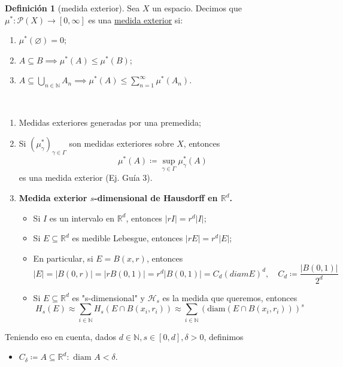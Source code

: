 \documentclass[11pt]{article}
\theoremstyle{definition} %
\newtheorem{definition}[theorem]{Definición}
\newcommand{\R}{\mathbb{R}}
\newcommand{\N}{\mathbb{N}}
\begin{document}
\begin{property}
\begin{definition}[medida exterior]
	Sea $X$ un espacio. Decimos que $\mu^{*} : \mathscr{P}(X)\to[0,\infty]$ es una \underline{medida exterior} si:
	\begin{enumerate}
		\item $\mu^{*}(\varnothing) = 0$;

		\item $A \subseteq B \implies \mu^{*}(A)\leq \mu^{*}(B)$;

		\item $A \subseteq \bigcup_{n\in\N} A_n \implies \mu^{*}(A) \leq \sum_{n=1}^{\infty} \mu^{*}(A_n)$.
	\end{enumerate}
\end{definition}

\begin{eg}~
	\begin{enumerate}
		\item Medidas exteriores generadas por una premedida;

		\item Si $(\mu_{\gamma}^{*})_{\gamma\in\Gamma}$ son medidas exteriores sobre $X$, entonces
		\[ \mu^{*}(A) \coloneq \sup_{\gamma\in\Gamma} \mu_{\gamma}^{*}(A) \]
		es una medida exterior (Ej. Guía 3).

		\item \textbf{Medida exterior $s$-dimensional de Hausdorff en $\R^d$.}
		\begin{itemize}
			\item Si $I$ es un intervalo en $\R^d$, entonces $|rI| = r^d|I|$;

			\item Si $E \subseteq \R^d$ es medible Lebesgue, entonces $|rE| = r^d|E|$;

			\item En particular, si $E = B(x,r)$, entonces
			\[ |E| = |B(0,r)| = |rB(0,1)| = r^d|B(0,1)| = C_d (diam E)^d,\quad C_d \coloneq \frac{|B(0,1)|}{2^d} \]

			\item Si $E \subseteq \R^d$ es "s-dimensional" y $\mathscr{H}_s$ es la medida que queremos, entonces 
      \[ H_s(E) \approx \sum_{i\in \N} H_s(E\cap B(x_i,r_i))\approx \sum_{i \in \N}(\text{diam}(E\cap B(x_i,r_i)))^s \]
		\end{itemize}
	\end{enumerate}
\end{eg}

Teniendo eso en cuenta, dados $d \in \N, s \in [0,d], \delta >0$, definimos
\begin{itemize}
  \item $C_{\delta}\coloneqq {A\subseteq \R^d:\text{  diam } A < \delta }$. \\
  

\end{itemize}
\end{property}
\end{document}
